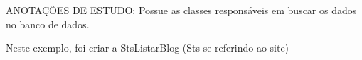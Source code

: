 ANOTAÇÕES DE ESTUDO:
Possue as classes responsáveis em buscar os dados no banco de dados.

Neste exemplo, foi criar a StsListarBlog (Sts se referindo ao site)

